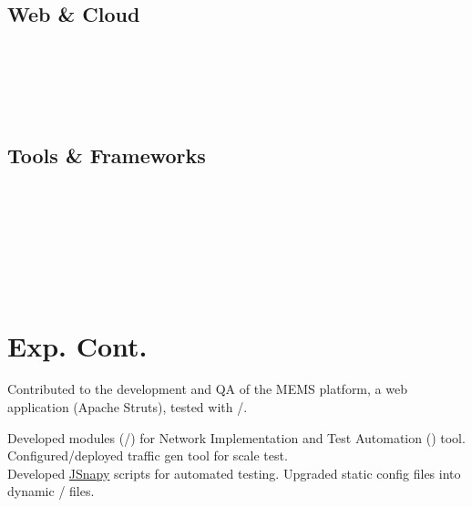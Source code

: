 \documentclass[a4paper]{resume}
\begin{document}
\begin{minipage}[t]{0.33\textwidth}
	\subsection{Web \& Cloud}
	\smallsectionspace{}
	\xml{} \textbullet{} \json{} \\
	\css{} \textbullet{} \react{} \\
	\aws{} \boto{} \textbullet{} \ectwo{} \textbullet{} \rds{} \\
	\jnciaJunos{} \textbullet{} \jnciaDevOps{} \\
	\sectionspace{}

	\subsection{Tools \& Frameworks}
	\smallsectionspace{}
	\mongo{} \textbullet{} \rocksdb{} \textbullet{} \cuda{} \\
	\linux{} \textbullet{} \git{} \textbullet{} \docker{} \\
	\cmake{} \textbullet{} \cargo{} \textbullet{} \conan{} \textbullet{} \gdb{} \\
	\pytest{} \textbullet{} \asyncio{} \textbullet{} \nodejs{} \\
	\spring{} \textbullet{} \googletest{} \textbullet{} \junit{} \\
	\cucumber{} \textbullet{} \ansible{} \\

	\section{Exp. Cont.}
	\smallsectionspace{}

	\textbullet{} Contributed to the development and QA of the MEMS platform, a \java{} web
	application (Apache Struts), tested with \junit{}/\cucumber{}. \\
	\smallsectionspace{}
	\smallsectionspace{}

	\textbullet{} Developed modules (\python{}/\ansible{}) for Network Implementation and Test Automation (\nita) tool.
	Configured/deployed \href{https://github.com/Juniper/warp17}{\warp} traffic gen tool for scale test. \\
	\textbullet{} Developed \href{https://github.com/Juniper/jsnapy}{JSnapy} scripts for automated testing. Upgraded
	static \junos{} config files into dynamic \jinja{}/\yaml{} files. \\
	\smallsectionspace{}

\end{minipage} %
\end{document}
